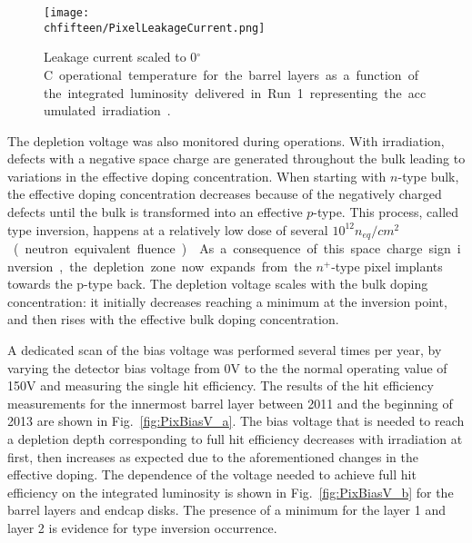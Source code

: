 \begin{figure}[!htb]
 \begin{center}
 \texttt{[image: \\chfifteen/PixelLeakageCurrent.png]}
 \end{center}
 \caption{Leakage current scaled to 0\unit{$^\circ$C} operational temperature for the barrel layers as a function of the integrated luminosity delivered in Run~1 representing the accumulated irradiation~\cite{Veszpremi:2014hpa}.}
 \label{fig:PixLeakageCurrent}
\end{figure}

The depletion voltage was also monitored during operations.
With irradiation, defects with a negative space charge are generated throughout the bulk leading to variations in the effective doping concentration.
When starting with $n$-type bulk, the effective doping concentration decreases because of the negatively charged defects until the bulk is transformed into an effective $p$-type.
This process, called type inversion, happens at a relatively low dose of several $10^{12}$\unit{$n_{eq}/cm^2$} (neutron equivalent fluence)~\cite{PixelDetectorsBook2006}.
As a consequence of this space charge sign inversion, the depletion zone now expands from the $n^+$-type pixel implants towards the p-type back.
The depletion voltage scales with the bulk doping concentration: it initially decreases reaching a minimum at the inversion point, and then rises with the effective bulk doping concentration.

A dedicated scan of the bias voltage was performed several times per year, by varying the detector bias voltage from 0\unit{V} to the the normal operating value of 150\unit{V} and measuring the single hit efficiency.
The results of the hit efficiency measurements for the innermost barrel layer between 2011 and the beginning of 2013 are shown in Fig.~\ref{fig:PixBiasV_a}.
The bias voltage that is needed to reach a depletion depth corresponding to full hit efficiency decreases with irradiation at first, then increases as expected due to the aforementioned changes in the effective doping.
The dependence of the voltage needed to achieve full hit efficiency on the integrated luminosity is shown in Fig.~\ref{fig:PixBiasV_b} for the barrel layers and endcap disks.
The presence of a minimum for the layer 1 and layer 2 is evidence for type inversion occurrence.\\

